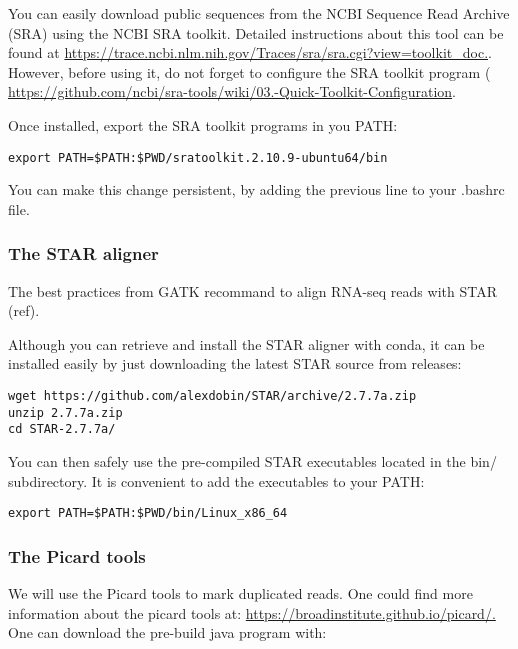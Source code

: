 You can easily download public sequences from the NCBI Sequence Read Archive (SRA) using the NCBI SRA toolkit. Detailed instructions about this tool can be found at \href{https://trace.ncbi.nlm.nih.gov/Traces/sra/sra.cgi?view=toolkit_doc}{https://trace.ncbi.nlm.nih.gov/Traces/sra/sra.cgi?view=toolkit\_doc.}. However, before using it, do not forget to configure the SRA toolkit program ( \href{https://github.com/ncbi/sra-tools/wiki/03.-Quick-Toolkit-Configuration}{https://github.com/ncbi/sra-tools/wiki/03.-Quick-Toolkit-Configuration}.


Once installed, export the SRA toolkit programs in you PATH:

\begin{verbatim}
export PATH=$PATH:$PWD/sratoolkit.2.10.9-ubuntu64/bin
\end{verbatim}

You can make this change persistent, by adding the previous line to your .bashrc file.


\subsubsection{The STAR aligner}

The best practices from GATK recommand to align RNA-seq reads with STAR (ref). 

Although you can retrieve and install the STAR aligner with conda, it can be installed easily by just downloading the latest STAR source from releases:

\begin{verbatim} 
wget https://github.com/alexdobin/STAR/archive/2.7.7a.zip
unzip 2.7.7a.zip
cd STAR-2.7.7a/
\end{verbatim}

You can then safely use the pre-compiled STAR executables located in the bin/ subdirectory. It is convenient to add the executables to your PATH:

\begin{verbatim}
export PATH=$PATH:$PWD/bin/Linux_x86_64
\end{verbatim}



\subsubsection{The Picard tools}

We will use the Picard tools to mark duplicated reads. One could find more information about the picard tools at: 
\href{https://broadinstitute.github.io/picard/}{https://broadinstitute.github.io/picard/.} One can download the pre-build java program with:

